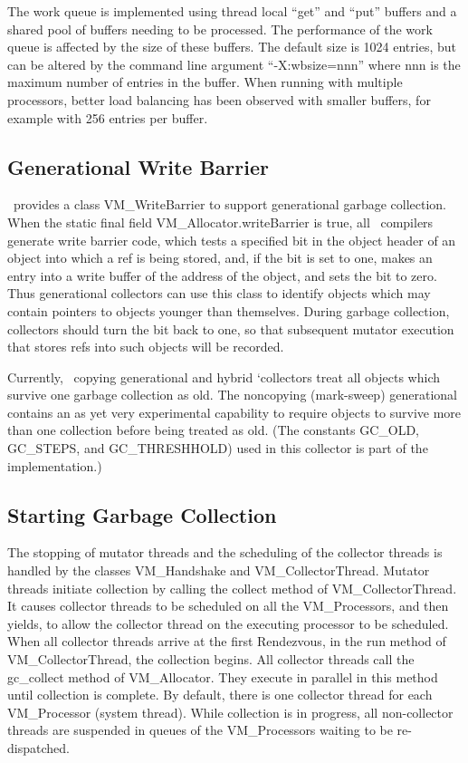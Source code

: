 The work queue is implemented using thread local ``get'' and ``put'' buffers
and a shared pool of buffers needing to be processed.  The performance of the
work queue is affected by the size of these buffers.  The default size is 1024 
entries, but can be altered by the command line argument ``-X:wbsize=nnn'' where
nnn is the maximum number of entries in the buffer.  When running with multiple
processors, better load balancing has been observed with smaller buffers, for
example with 256 entries per buffer.  

\subsection{Generational Write Barrier} \label{sssec:writebarrier}
\jp\ provides a class VM\_WriteBarrier to support generational garbage 
collection. When the static final field VM\_Allocator.writeBarrier is true,
all \jp\ compilers generate write barrier code, which tests a specified
bit in the object header of an object into which a ref is being stored,
and, if the bit is set to one, makes an entry into a write buffer of the 
address of the object, and sets the bit to zero.  Thus generational 
collectors can use this class to 
identify objects which may contain pointers to objects 
younger than themselves.  During garbage collection, collectors should
turn the bit back to one, so that subsequent mutator execution that stores
refs into such objects will be recorded.

Currently, \jp\ copying generational and hybrid 
`collectors treat all objects which
survive one garbage collection as old.  The noncopying (mark-sweep) 
generational contains an as yet very experimental capability to require
objects to survive more than one collection before being treated as old.
(The constants GC\_OLD, GC\_STEPS, and GC\_THRESHHOLD) used in this 
collector is part of the implementation.)


\subsection{Starting Garbage Collection} \label{sssec:startgc}
The stopping of mutator threads and the scheduling of the collector
threads is handled by the classes VM\_Handshake and VM\_CollectorThread.
Mutator threads initiate collection by calling the collect method
of VM\_CollectorThread.  It causes collector threads to be scheduled
on all the VM\_Processors, and then yields, to allow the collector thread
on the executing processor to be scheduled. When all collector threads
arrive at the first Rendezvous, in the run method of VM\_CollectorThread,
the collection begins.
All collector threads 
call the gc\_collect method of VM\_Allocator.  They execute
in parallel in this method until collection is complete.  By default,
there is one collector thread for each VM\_Processor (system thread).
While collection is in progress, all non-collector threads are suspended
in queues of the VM\_Processors waiting to be re-dispatched.

